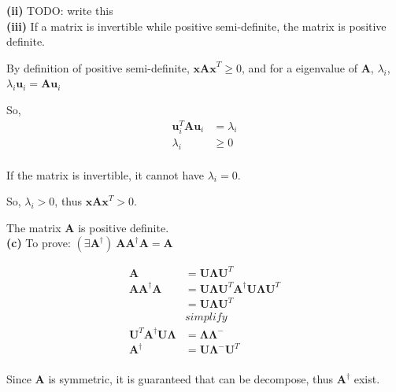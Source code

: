 \documentclass[11pt]{article}
\begin{document}
\textbf{(ii)}
TODO: write this\\

\textbf{(iii)}
If a matrix is invertible while positive semi-definite, the matrix is positive definite.

By definition of positive semi-definite, $\textbf{xAx}^T\ge 0$, and for a eigenvalue of $\textbf{A}$, $\lambda_i$, $\lambda_i\textbf{u}_i=\textbf{Au}_i$ 

So, 
\begin{equation} \label{eq7}
\begin{split}
\textbf{u}_i^T\textbf{A}\textbf{u}_i&=\lambda_i\\
\lambda_i&\ge 0\\
\end{split}
\end{equation}

If the matrix is invertible, it cannot have $\lambda_i = 0$.

So, $\lambda_i>0$, thus $\textbf{xAx}^T>0$.

The matrix \textbf{A} is positive definite.\\

\noindent\textbf{(c)}
To prove: $(\exists \textbf{A}^\dagger)\ \textbf{AA}^\dagger \textbf{A} = \textbf{A}$

\begin{equation} \label{eq7}
\begin{split}
\textbf{A}&=\textbf{U}\pmb{\Lambda}\textbf{U}^T\\
\textbf{AA}^\dagger \textbf{A}&=\textbf{U}\pmb{\Lambda}\textbf{U}^T\textbf{A}^\dagger\textbf{U}\pmb{\Lambda}\textbf{U}^T\\
&=\textbf{U}\pmb{\Lambda}\textbf{U}^T\\
&simplify\\
\textbf{U}^T\textbf{A}^\dagger\textbf{U}\pmb{\Lambda}&=\pmb{\Lambda}\pmb{\Lambda}^-\\
\textbf{A}^\dagger&=\textbf{U}\pmb{\Lambda}^{-}\textbf{U}^T\\
\end{split}
\end{equation}

Since \textbf{A} is symmetric, it is guaranteed that can be decompose,
thus $\textbf{A}^\dagger$ exist.
\end{document}
